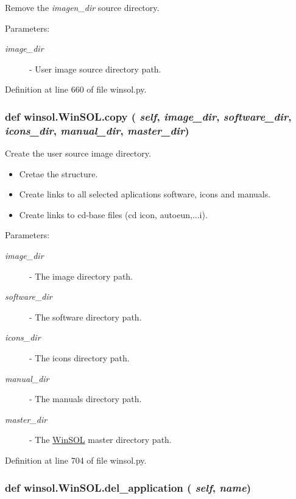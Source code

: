 Remove the {\em imagen\_\-dir\/} source directory. 

\begin{Desc}
\item[Parameters:]
\begin{description}
\item[{\em image\_\-dir}]- User image source directory path. \end{description}
\end{Desc}


Definition at line 660 of file winsol.py.\hypertarget{classwinsol_1_1WinSOL_0b0ba2df6d422e7c6ab5ef4c97050f3f}{
\subsubsection[copy]{\setlength{\rightskip}{0pt plus 5cm}def winsol.Win\-SOL.copy ( {\em self},  {\em image\_\-dir},  {\em software\_\-dir},  {\em icons\_\-dir},  {\em manual\_\-dir},  {\em master\_\-dir})}}
\label{classwinsol_1_1WinSOL_0b0ba2df6d422e7c6ab5ef4c97050f3f}


Create the user source image directory. 

\begin{itemize}
\item Cretae the structure. \item Create links to all selected aplications software, icons and manuals. \item Create links to cd-base files (cd icon, autoeun,...i).\end{itemize}
\begin{Desc}
\item[Parameters:]
\begin{description}
\item[{\em image\_\-dir}]- The image directory path. \item[{\em software\_\-dir}]- The software directory path. \item[{\em icons\_\-dir}]- The icons directory path. \item[{\em manual\_\-dir}]- The manuals directory path. \item[{\em master\_\-dir}]- The \hyperlink{classwinsol_1_1WinSOL}{Win\-SOL} master directory path. \end{description}
\end{Desc}


Definition at line 704 of file winsol.py.\hypertarget{classwinsol_1_1WinSOL_423da76b9737ecb160711bc9c861189c}{
\subsubsection[del\_\-application]{\setlength{\rightskip}{0pt plus 5cm}def winsol.Win\-SOL.del\_\-application ( {\em self},  {\em name})}}
\label{classwinsol_1_1WinSOL_423da76b9737ecb160711bc9c861189c}


